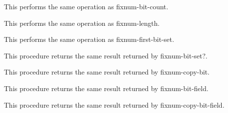 \begin{entry}{%
}

This performs the same operation as {\cf fixnum-bit-count}.
\end{entry}

\begin{entry}{%
}

This performs the same operation as {\cf fixnum-length}.
\end{entry}

\begin{entry}{%
}

This performs the same operation as {\cf fixnum-first-bit-set}.
\end{entry}

\begin{entry}{%
}

  This procedure
returns the same result returned by {\cf fixnum-bit-set?}.
\end{entry}

\begin{entry}{%
}

  This procedure returns the same result returned by {\cf
  fixnum-copy-bit}.
\end{entry}

\begin{entry}{%
}

  This procedure returns the same result
  returned by {\cf fixnum-bit-field}.
\end{entry}

\begin{entry}{%
}

  This procedure returns the same result
  returned by {\cf fixnum-copy-bit-field}.
\end{entry}


